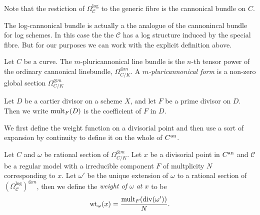 Note that the restiction of $\Omega_{\mathscr C}^{\log}$ to the generic fibre is the cannonical bundle on $C$. 

\begin{remark}
	The log-cannonical bundle is actually a the analogue of the cannonincal bundle for log schemes. 
	In this case the the $\mathscr C$ has a log structure induced by the special fibre. 
	But for our purposes we can work with the explicit definition above. 
\end{remark}
\begin{definition}
	Let $C $ be a curve.
	The $m$-pluricannonical line bundle is the $n$-th tensor power of the ordinary cannonical linebundle, $\Omega_{C / K}^{\otimes m }$. 
	A \emph{$m$-pluricannonical form}  is a non-zero global section $\Omega_{C / K}^{\otimes m }$
\end{definition}
\begin{notation}
	Let $D$ be a cartier divisor on a scheme $X$, and let $F$ be a prime divisor on $D$. 
	Then we write $\operatorname{mult}_{F}(D)$ is the coefficient of $F$ in $D$. 
\end{notation}

We first define the weight function on a divisorial point and then use a sort of expansion by continuity to define it on the whole of $C{}^{\text{an}}$. 
\begin{definition}\label{def:weight_function_divisorial_point}
	Let $C$ and $\omega$ be rational section of $\Omega_{C / K}^{\otimes m}$.
	Let $x$ be a divisorial point in $C{}^{\text{an}}$ and $\mathscr C$ be a regular model  with a irreducible component $F$ of multplicity $N$ corresponding to $x$. 
	Let $\omega'$ be the unique extension of $\omega$ to a rational section of $(\Omega_{\mathscr C} ^{\text{log}})^{\otimes m}$, then we define the \emph{weight of $\omega$ at $x$} to be \[
		\operatorname{wt}_\omega(x) = \frac{\operatorname{mult}_F(\operatorname{div}(\omega'))}{N}
	.\] 
\end{definition}

